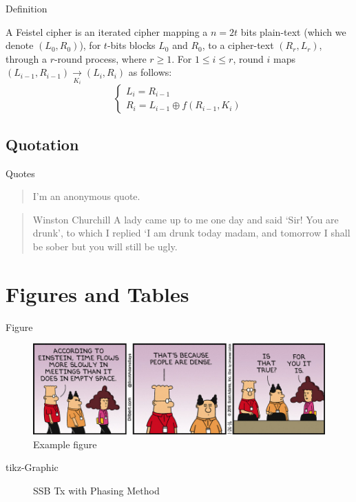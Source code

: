 \documentclass[aspectratio=169,envcountsect]{beamer}    %
\begin{document}
\begin{frame}{Definition}
 \begin{definition}
  A Feistel cipher is an iterated cipher mapping a \(n = 2t\) bits plain-text (which we denote \((L_0,R_0)\)), for \(t\)-bits blocks \(L_0\) and \(R_0\), to a cipher-text \((R_r,L_r)\), through a \(r\)-round process, where \(r\geq 1\). For \(1 \leq i \leq r\), round \(i\) maps \((L_{i-1},R_{i-1}) \underset{K_i}{\rightarrow} (L_i,R_i)\) as follows:
  \[
   \left\{\begin{array}{l}
    L_i = R_{i-1} \\
    R_i = L_{i-1} \oplus f(R_{i-1},K_i)
   \end{array}\right.
  \]
 \end{definition}
\end{frame}

\subsection{Quotation}
\begin{frame}{Quotes}
 \begin{quote}{}
  I'm an anonymous quote.
 \end{quote}
 \begin{quote}{Winston Churchill}
  A lady came up to me one day and said `Sir! You are drunk', to which I replied `I am drunk today madam, and tomorrow I shall be sober but you will still be ugly.
 \end{quote}
\end{frame}

\section{Figures and Tables}
\begin{frame}{Figure}
 \begin{figure}[h]
  \centering
  \includegraphics[width=.8\textwidth]{images/example}
  \caption{Example figure}
  \label{fig:ex1}
 \end{figure}
\end{frame}

\begin{frame}{tikz-Graphic}
 \begin{figure}[h]
  \centering
  
  \caption{SSB Tx with Phasing Method}
  \label{fig:ex2}
 \end{figure}
\end{frame}
\end{document}
